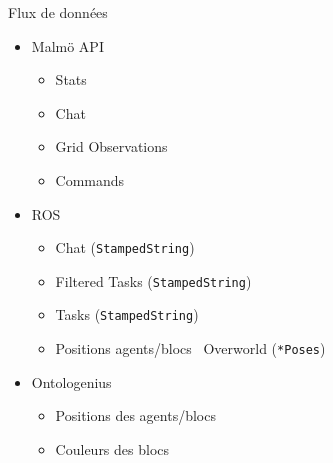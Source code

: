 \documentclass[aspectratio=169]{audition-beamer}
\begin{document}
\begin{frame}{Flux de données}

  \vfill
  \begin{itemize}
    \item Malmö API 
          \begin{itemize}[<.(2)->]
            \item Stats
            \item Chat
            \item Grid Observations
            \item Commands
          \end{itemize}
    \item ROS
          \begin{itemize}[<.(3)->]
            \item Chat (\texttt{StampedString})
            \item Filtered Tasks (\texttt{StampedString})
            \item Tasks (\texttt{StampedString})
            \item Positions agents/blocs \textrightarrow\ Overworld (\texttt{*Poses})
          \end{itemize}
    \item Ontologenius
          \begin{itemize}[<.(4)->]
            \item Positions des agents/blocs 
            \item Couleurs des blocs 
          \end{itemize}
  \end{itemize}

\end{frame}
\end{document}
